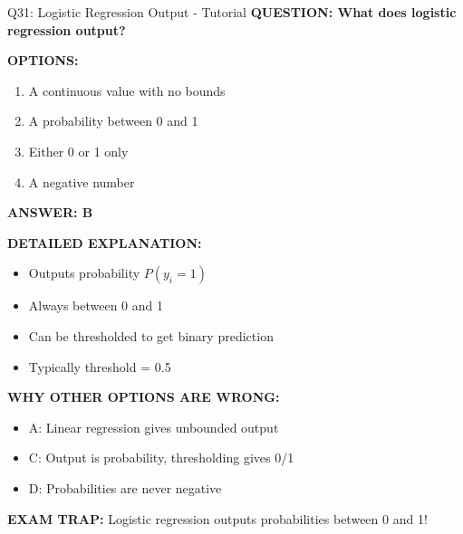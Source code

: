 \documentclass[8pt]{beamer}
\begin{document}
	\begin{frame}{Q31: Logistic Regression Output - Tutorial}
		\fontsize{6.5}{7.5}\selectfont
		\textbf{QUESTION: What does logistic regression output?}
		
		\vspace{0.1cm}
		\textbf{OPTIONS:}
		\begin{enumerate}
			\item A continuous value with no bounds
			\item A probability between 0 and 1
			\item Either 0 or 1 only
			\item A negative number
		\end{enumerate}
		
		\vspace{0.1cm}
		\textcolor{myblue}{\textbf{ANSWER: B}}
		
		\vspace{0.1cm}
		\textbf{DETAILED EXPLANATION:}
		\begin{itemize}
			\item Outputs probability $P(y_i = 1)$
			\item Always between 0 and 1
			\item Can be thresholded to get binary prediction
			\item Typically threshold = 0.5
		\end{itemize}
		
		\vspace{0.1cm}
		\textcolor{myred}{\textbf{WHY OTHER OPTIONS ARE WRONG:}}
		\begin{itemize}
			\item \textcolor{myred}{A:} Linear regression gives unbounded output
			\item \textcolor{myred}{C:} Output is probability, thresholding gives 0/1
			\item \textcolor{myred}{D:} Probabilities are never negative
		\end{itemize}
		
		\textcolor{myred}{\textbf{EXAM TRAP:}} Logistic regression outputs \textcolor{myblue}{probabilities between 0 and 1}!
	\end{frame}
	
\end{document}
